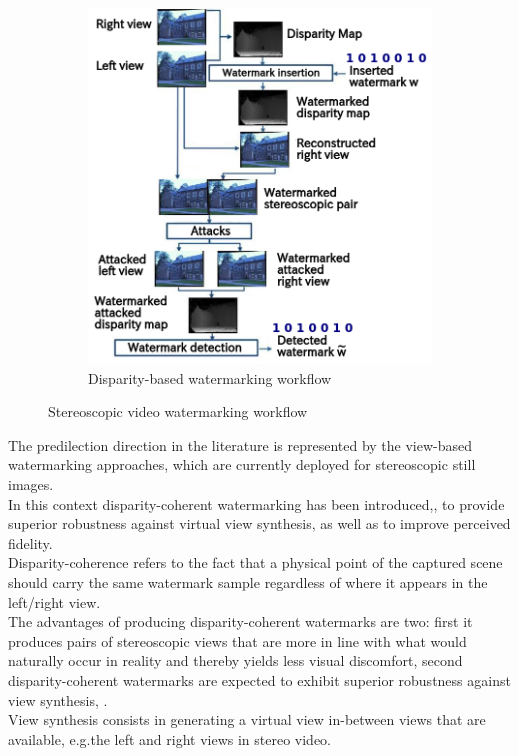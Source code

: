 \begin{figure}[h!]
\begin{subfigure}[]{0.4\textwidth}
\centering
\includegraphics[width=1.05\textwidth]{./img/disparity_domain.png}
\caption{\small{Disparity-based watermarking workflow}}
\label{fig:disp}
\end{subfigure}
\caption{\small{Stereoscopic video watermarking workflow}\label{stereo_method}}
\end{figure}

The predilection direction in the literature is represented by the view-based watermarking approaches, which are currently deployed for stereoscopic still images.\\ 
In this context disparity-coherent watermarking has been introduced,\cite{DOER}, to provide superior robustness against virtual view synthesis, as well as to improve perceived fidelity.\\
Disparity-coherence refers to the fact that a physical point of the captured scene should carry the
same watermark sample regardless of where it appears in the left/right view.\\
The advantages of producing disparity-coherent watermarks are two: first it produces pairs of stereoscopic views that are more in line with
what would naturally occur in reality and thereby yields less visual discomfort, second  disparity-coherent watermarks are expected to exhibit superior robustness against view synthesis, \cite{DOER}.\\
View synthesis consists in generating a virtual view in-between views that are available, e.g.the left and right views in stereo video. 

